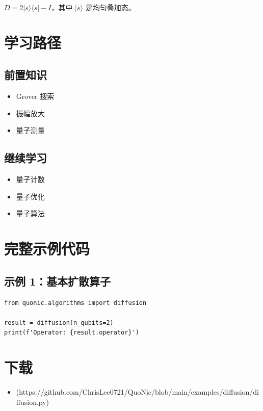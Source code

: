 \documentclass[12pt,a4paper]{article}
\begin{document}
$D = 2|s\rangle\langle s| - I$，其中 $|s\rangle$ 是均匀叠加态。

\section{学习路径}

\subsection{前置知识}
\begin{itemize}
  \item Grover 搜索
  \item 振幅放大
  \item 量子测量
\end{itemize}

\subsection{继续学习}
\begin{itemize}
  \item 量子计数
  \item 量子优化
  \item 量子算法
\end{itemize}

\section{完整示例代码}

\subsection{示例 1：基本扩散算子}

\begin{verbatim}
from quonic.algorithms import diffusion

result = diffusion(n_qubits=2)
print(f'Operator: {result.operator}')
\end{verbatim}

\section{下载}

\begin{itemize}
  \item [diffusion.py](https://github.com/ChrisLee0721/QuoNic/blob/main/examples/diffusion/diffusion.py)
\end{itemize}
\end{document}
